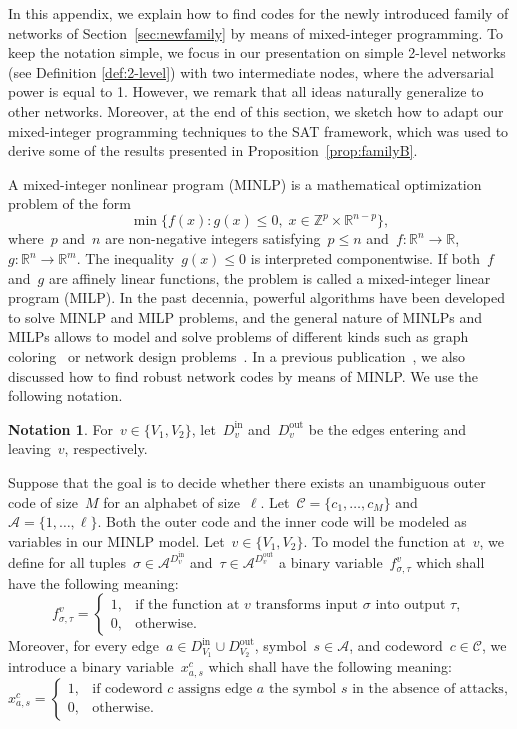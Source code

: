 \documentclass[11pt,a4paper]{article}
\theoremstyle{definition}
\newtheorem{notation}[theorem]{Notation}
\newcommand{\numberset}{\mathds}
\newcommand{\Z}{\numberset{Z}}
\newcommand{\R}{\numberset{R}}
\begin{document}
In this appendix, we explain how to find codes for the newly
introduced family of networks of Section~\ref{sec:newfamily} by means of
mixed-integer programming. To keep the notation simple, we focus in our presentation on simple 2-level networks (see Definition \ref{def:2-level}) with two intermediate nodes, where the adversarial power is equal to 1. However, we remark that all ideas naturally generalize to other networks. Moreover, at the end of this section, we sketch how to adapt our mixed-integer programming techniques to the SAT framework, which was used to derive some of the results presented in Proposition~\ref{prop:familyB}.

A mixed-integer nonlinear program (MINLP) is a mathematical optimization
problem of the form
\[
  \min\{ f(x) : g(x) \leq 0,\; x \in \Z^p \times \R^{n-p}\},
\]
where~$p$ and~$n$ are non-negative integers satisfying~$p \leq n$ and~$f\colon \R^n \to \R$,
$g\colon \R^n \to \R^m$.
The inequality~$g(x) \leq 0$ is interpreted componentwise.
If both~$f$ and~$g$ are affinely linear functions, the problem is called a
mixed-integer linear program (MILP).
In the past decennia, powerful algorithms have been developed to solve
MINLP and MILP problems, and the general nature of MINLPs and MILPs allows
to model and solve problems of different kinds such as graph coloring~\cite{CollEtAl2002}
or network design problems~\cite{GounarisEtAl2016}.
In a previous publication~\cite{hojny2023role}, we also discussed how to find robust network
codes by means of MINLP. We use the following notation.
\begin{notation}
For~$v \in \{V_1,V_2\}$, let~$D^{\text{in}}_v$ and~$D^{\text{out}}_v$ be
the edges entering and leaving~$v$, respectively.
\end{notation}


Suppose that the goal is to decide whether there exists an unambiguous outer
code of size~$M$ for an alphabet of size~$\ell$.
Let~$\mathcal{C} = \{c_1,\dots,c_M\}$ and~$\mathcal{A} = \{1,\dots,\ell\}$.
Both the outer code and the inner code will be modeled as variables in our MINLP model.
Let~$v \in \{V_1,V_2\}$.
To model the function at~$v$, we define for all tuples~$\sigma
\in \mathcal{A}^{D^{\text{in}}_v}$ and~$\tau \in
\mathcal{A}^{D^{\text{out}}_v}$ a binary variable~$f^v_{\sigma,\tau}$ which
shall have the following meaning:
\[
  f^v_{\sigma,\tau}
  =
  \begin{cases}
    1, & \text{if the function at~$v$ transforms input~$\sigma$ into output~$\tau$},\\
    0, & \text{otherwise}.    
  \end{cases}
\]
Moreover, for every edge~$a \in D^{\text{in}}_{V_1} \cup
D^{\text{out}}_{V_2}$, symbol~$s \in \mathcal{A}$, and codeword~$c \in
\mathcal{C}$, we introduce a binary variable~$x^c_{a,s}$ which shall have
the following meaning:
\[
  x^c_{a,s}
  =
  \begin{cases}
    1, & \text{if codeword~$c$ assigns edge~$a$ the symbol~$s$ in the absence of
         attacks},\\
    0, & \text{otherwise}.
  \end{cases}
\]
\end{document}
